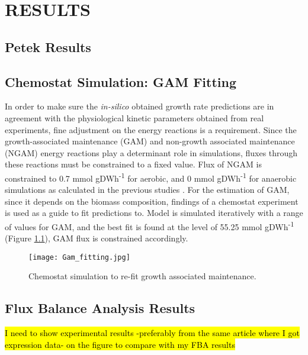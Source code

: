 \chapter{RESULTS}


\section{Petek Results}




\section{Chemostat Simulation: GAM Fitting}
In order to make sure the \emph{in-silico} obtained growth rate predictions are in agreement with the physiological kinetic parameters obtained from real experiments, fine adjustment on the energy reactions is a requirement. Since the growth-associated maintenance (GAM) and non-growth associated maintenance (NGAM) energy reactions play a determinant role in simulations, fluxes through these reactions must be constrained to a fixed value. Flux of NGAM is constrained to 0.7 mmol gDWh\textsuperscript{-1} for aerobic, and 0 mmol gDWh\textsuperscript{-1} for anaerobic simulations as calculated in the previous studies \cite{nilsson2016metabolic}. For the estimation of GAM, since it depends on the biomass composition, findings of a chemostat experiment  \cite{van1998effect} is used as a guide to fit predictions to. Model is simulated iteratively with a range of values for GAM, and the best fit is found at the level of 55.25 mmol gDWh\textsuperscript{-1} (Figure \ref{fig:Gam_fitting}), GAM flux is constrained accordingly.

\begin{figure}[H]
\begin{center}
\texttt{[image: Gam\_fitting.jpg]}
\end{center}
\caption[Chemostat simulation to re-fit growth associated maintenance]{Chemostat simulation to re-fit growth associated maintenance.}
\label{fig:Gam_fitting}
\end{figure}


\section{Flux Balance Analysis Results}
\hl{I need to show experimental results -preferably from the same article where I got expression data- on the figure to compare with my FBA results}

